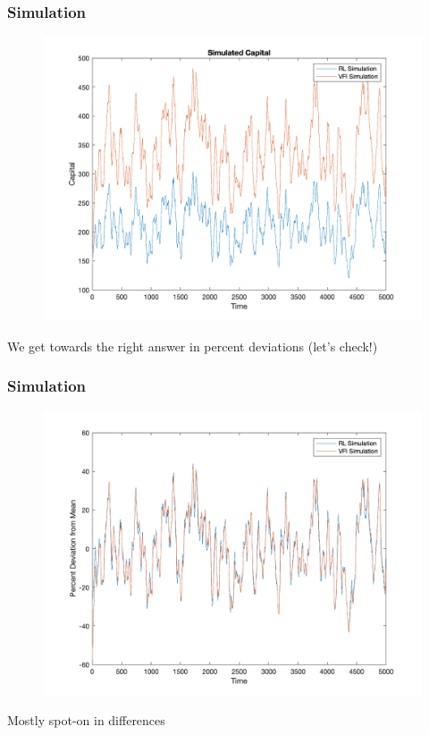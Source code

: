 \documentclass{beamer}
\begin{document}
\begin{frame}
\frametitle[alignment=center]{Simulation}
\begin{figure}
\centering
\includegraphics[scale=0.25]{Fig7.png}
\end{figure}
We get towards the right answer in percent deviations (let's check!)
\end{frame}


\begin{frame}
\frametitle[alignment=center]{Simulation}
\begin{figure}
\centering
\includegraphics[scale=0.25]{Fig8.png}
\end{figure}
Mostly spot-on in differences
\end{frame}
\end{document}
